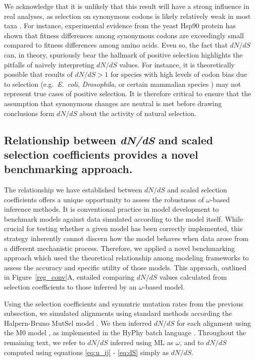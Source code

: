 \documentclass[11pt]{article}
\begin{document}
We acknowledge that it is unlikely that this result will have a strong influence in real analyses, as selection on synonymous codons is likely relatively weak in most taxa \cite{HershbergPetrov2008}. For instance, experimental evidence from the yeast Hsp90 protein has shown that fitness differences among synonymous codons are exceedingly small compared to fitness differences among amino acids.  Even so, the fact that $dN/dS$ can, in theory, spuriously bear the hallmark of positive selection highlights the pitfalls of naively interpreting $dN/dS$ values.  For instance, it is theoretically possible that results of $dN/dS > 1$ for species with high levels of codon bias due to selection (e.g.\ \emph{E.\ coli}, \emph{Drosophila}, or certain mammalian species \cite{Duret2002, Chamaryetal2006, PlotkinKudla2010}) may not represent true cases of positive selection. It is therefore critical to ensure that the assumption that synonymous changes are neutral is met before drawing conclusions form $dN/dS$ about the activity of natural selection.

\subsection*{Relationship between \emph{dN/dS} and scaled selection coefficients provides a novel benchmarking approach.}

The relationship we have established between $dN/dS$ and scaled selection coefficients offers a unique opportunity to assess the robustness of $\omega$-based inference methods. It is conventional practice in model development to benchmark models against data simulated according to the model itself. While crucial for testing whether a given model has been correctly implemented, this strategy inherently cannot discern how the model behaves when data arose from a different mechanistic process. Therefore, we applied a novel benchmarking approach which used the theoretical relationship among modeling frameworks to assess the accuracy and specific utility of those models. This approach, outlined in Figure~\ref{reg_conv}A, entailed comparing $dN/dS$ values calculated from selection coefficients to those inferred by an $\omega$-based model.

Using the selection coefficients and symmtric mutation rates from the previous subsection, we simulated alignments using standard methods \cite{Yang2006} according the Halpern-Bruno MutSel model \cite{HalpernBruno1998}. We then inferred $dN/dS$ for each alignment using the M0 model \cite{GoldmanYang1994,Yangetal2000}, as implemented in the HyPhy batch language \cite{KosakovskyPondetal2005}. Throughout the remaining text, we refer to $dN/dS$ inferred using ML as $\omega$, and to $dN/dS$ computed using equations \eqref{eq:u_ij} - \eqref{eq:dS} simply as $dN/dS$. 
\end{document}
